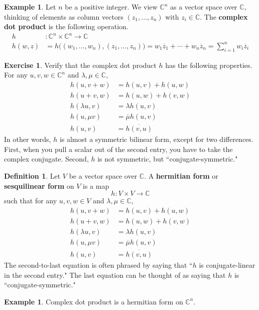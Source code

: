 \documentclass[12pt]{article}
\theoremstyle{definition}
\newtheorem{definition}[theorem]{Definition}
\newtheorem{example}[theorem]{Example}
\newtheorem{exercise}[theorem]{Exercise}
\newcommand{\C}{\mathbb{C}}
\newcommand{\lam}{\lambda}
\newcommand{\tbf}{\textbf}
\newcommand{\ov}{\overline}
\begin{document}
\begin{example}
Let $n$ be a positive integer. We view $\C^n$ as a vector space over $\C$, thinking of elements as column vectors $(z_1, \ldots, z_n)$ with $z_i \in \C$. The \tbf{complex dot product} is the following operation.
\begin{align*}
	h&:\C^n \times \C^n \to \C  \\
	h(w, z) &=  h\Big( (w_1, \ldots, w_n),  (z_1, \ldots, z_n) \Big) = w_1 \ov z_1 + \cdots + w_n \ov z_n = \sum_{i=1}^n w_i \ov z_i
\end{align*}
\end{example}

\begin{exercise}
Verify that the complex dot product $h$ has the following properties. For any $u,v,w \in \C^n$ and $\lam, \mu \in \C$,
\begin{align*}
	h(u, v+w) &= h(u, v) + h(u,w) \\
	h(u+v, w) &= h(u,w) + h(v,w) \\
	h( \lam u, v) &= \lam h(u,v) \\
	h( u, \mu v) &= \ov \mu h(u,v) \\
	h(u,v) &= \ov{h(v,u)}
\end{align*}
In other words, $h$ is almost a symmetric bilinear form, except for two differences. First, when you pull a scalar out of the second entry, you have to take the complex conjugate. Second, $h$ is not symmetric, but ``conjugate-symmetric."
\end{exercise}

\begin{definition}
Let $V$ be a vector space over $\C$. A \tbf{hermitian form} or \tbf{sesquilinear form} on $V$ is a map
\[
	h:V \times V \to \C
\]
such that for any $u,v,w \in V$ and $\lam, \mu \in \C$, 
\begin{align*}
	h(u, v+w) &= h(u, v) + h(u,w) \\
	h(u+v, w) &= h(u,w) + h(v,w) \\
	h( \lam u, v) &= \lam h(u,v) \\
	h( u, \mu v) &= \ov \mu h(u,v) \\
	h(u,v) &= \ov{h(v,u)}
\end{align*}
The second-to-last equation is often phrased by saying that ``$h$ is conjugate-linear in the second entry." The last equation can be thought of as saying that $h$ is ``conjugate-symmetric."
\end{definition}

\begin{example}
Complex dot product is a hermitian form on $\C^n$.
\end{example}
\end{document}
